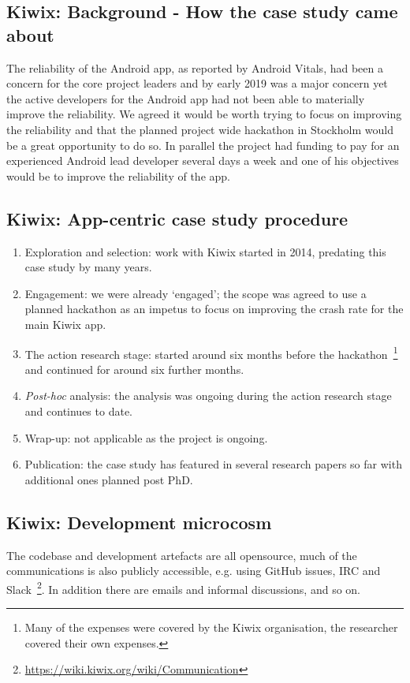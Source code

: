 \subsection{Kiwix: Background - How the case study came about}
The reliability of the Android app, as reported by Android Vitals, had been a concern for the core project leaders and by early 2019 was a major concern yet the active developers for the Android app had not been able to materially improve the reliability. We agreed it would be worth trying to focus on improving the reliability and that the planned project wide hackathon in Stockholm would be a great opportunity to do so. In parallel the project had funding to pay for an experienced Android lead developer several days a week and one of his objectives would be to improve the reliability of the app. 


\subsection{Kiwix: App-centric case study procedure}
{\small
\begin{enumerate}
    \itemsep0em
    \item Exploration and selection: work with Kiwix started in 2014, predating this case study by many years. 
    \item Engagement: we were already `engaged'; the scope was agreed to use a planned hackathon as an impetus to focus on improving the crash rate for the main Kiwix app.
    \item The action research stage: started around six months before the hackathon~\footnote{Many of the expenses were covered by the Kiwix organisation, the researcher covered their own expenses.} and continued for around six further months.
    \item \textit{Post-hoc} analysis: the analysis was ongoing during the action research stage and continues to date.
    \item Wrap-up: not applicable as the project is ongoing.
    \item Publication: the case study has featured in several research papers so far with additional ones planned post PhD.
\end{enumerate}
}


\subsection{Kiwix: Development microcosm}
The codebase and development artefacts are all opensource, much of the communications is also publicly accessible, e.g. using GitHub issues, IRC and Slack~\footnote{\url{https://wiki.kiwix.org/wiki/Communication}}. In addition there are emails and informal discussions, and so on.

